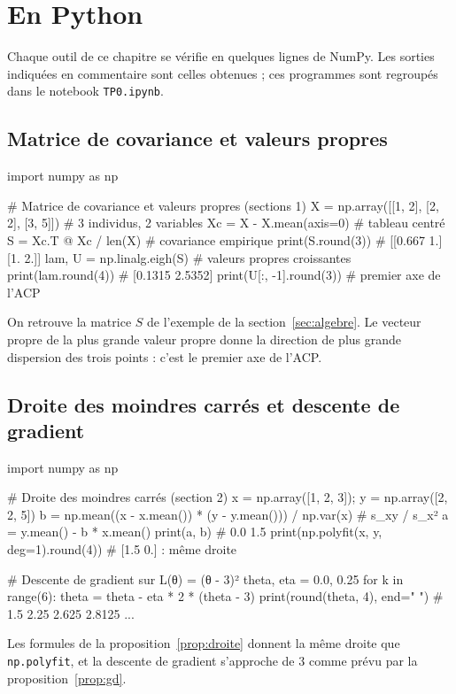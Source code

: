 \section{En Python}
\label{sec:python}

Chaque outil de ce chapitre se vérifie en quelques lignes de NumPy. Les sorties indiquées en commentaire sont celles obtenues ; ces programmes sont regroupés dans le notebook \texttt{TP0.ipynb}.

\subsection{Matrice de covariance et valeurs propres}
\begin{python}
import numpy as np

# Matrice de covariance et valeurs propres (sections 1)
X = np.array([[1, 2], [2, 2], [3, 5]])        # 3 individus, 2 variables
Xc = X - X.mean(axis=0)                        # tableau centré
S = Xc.T @ Xc / len(X)                         # covariance empirique
print(S.round(3))                              # [[0.667 1.] [1. 2.]]
lam, U = np.linalg.eigh(S)                     # valeurs propres croissantes
print(lam.round(4))                            # [0.1315 2.5352]
print(U[:, -1].round(3))                       # premier axe de l'ACP
\end{python}
On retrouve la matrice $S$ de l'exemple de la section~\ref{sec:algebre}. Le vecteur propre de la plus grande valeur propre donne la direction de plus grande dispersion des trois points : c'est le premier axe de l'ACP.

\subsection{Droite des moindres carrés et descente de gradient}
\begin{python}
import numpy as np

# Droite des moindres carrés (section 2)
x = np.array([1, 2, 3]); y = np.array([2, 2, 5])
b = np.mean((x - x.mean()) * (y - y.mean())) / np.var(x)   # s_xy / s_x²
a = y.mean() - b * x.mean()
print(a, b)                                    # 0.0 1.5
print(np.polyfit(x, y, deg=1).round(4))        # [1.5 0.] : même droite

# Descente de gradient sur L(θ) = (θ - 3)²
theta, eta = 0.0, 0.25
for k in range(6):
    theta = theta - eta * 2 * (theta - 3)
    print(round(theta, 4), end=" ")            # 1.5 2.25 2.625 2.8125 ...
\end{python}
Les formules de la proposition~\ref{prop:droite} donnent la même droite que \texttt{np.polyfit}, et la descente de gradient s'approche de $3$ comme prévu par la proposition~\ref{prop:gd}.

